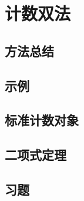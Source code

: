 \section{计数双法}

\subsection{方法总结}

\subsection{示例}

\subsection{标准计数对象}

\subsection{二项式定理}\label{sec:section8.4.4}

\subsection{习题}
